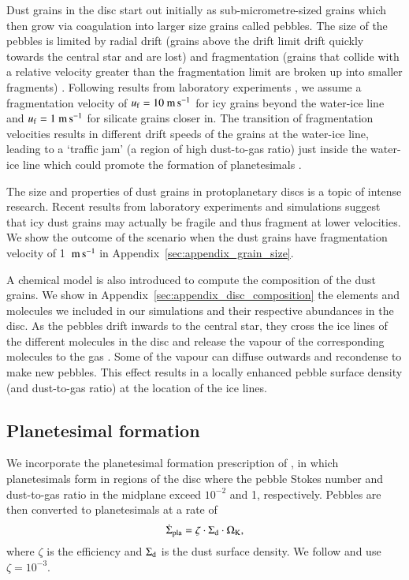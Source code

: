 \documentclass{aa}
\begin{document}
Dust grains in the disc start out initially as sub-micrometre-sized grains which then grow via coagulation into larger size grains called pebbles. The size of the pebbles is limited by radial drift (grains above the drift limit drift quickly towards the central star and are lost) and fragmentation (grains that collide with a relative velocity greater than the fragmentation limit are broken up into smaller fragments) \citep{Birnstiel2012}. Following results from laboratory experiments \citep{GundlachBlum2015}, we assume a fragmentation velocity of $u_{\rm f} = 10~{\rm m\,s}^{-1}$ for icy grains beyond the water-ice line and $u_{\rm f} = 1~{\rm m\,s}^{-1}$ for silicate grains closer in. The transition of fragmentation velocities results in different drift speeds of the grains at the water-ice line, leading to a ‘traffic jam’ (a region of high dust-to-gas ratio) just inside the water-ice line which could promote the formation of planetesimals \citep{DrazkowskaAlibert2017}.

The size and properties of dust grains in protoplanetary discs is a topic of intense research. Recent results from laboratory experiments \citep{MusiolikWurm2019} and simulations \citep{Jiang2023} suggest that icy dust grains may actually be fragile and thus fragment at lower velocities. We show the outcome of the scenario when the dust grains have fragmentation velocity of 1~${\rm m\,s}^{-1}$ in Appendix~\ref{sec:appendix_grain_size}.

A chemical model is also introduced to compute the composition of the dust grains. We show in Appendix~\ref{sec:appendix_disc_composition} the elements and molecules we included in our simulations and their respective abundances in the disc. As the pebbles drift inwards to the central star, they cross the ice lines of the different molecules in the disc and release the vapour of the corresponding molecules to the gas \citep{SchneiderBitsch2021}. Some of the vapour can diffuse outwards and recondense to make new pebbles. This effect results in a locally enhanced pebble surface density (and dust-to-gas ratio) at the location of the ice lines.

\subsection{Planetesimal formation}
We incorporate the planetesimal formation prescription of \citet{DrazkowskaAlibert2017}, in which planetesimals form in regions of the disc where the pebble Stokes number and dust-to-gas ratio in the midplane exceed $10^{-2}$ and 1, respectively. Pebbles are then converted to planetesimals at a rate of
\begin{equation}
	\Dot{\Sigma}_{\rm pla} = \zeta \cdot \Sigma_{\rm d} \cdot \Omega_{\rm K},
\end{equation}
where $\zeta$ is the efficiency and $\Sigma_{\rm d}$ is the dust surface density. We follow \citet{DrazkowskaAlibert2017} and use $\zeta = 10^{-3}$.
\end{document}
